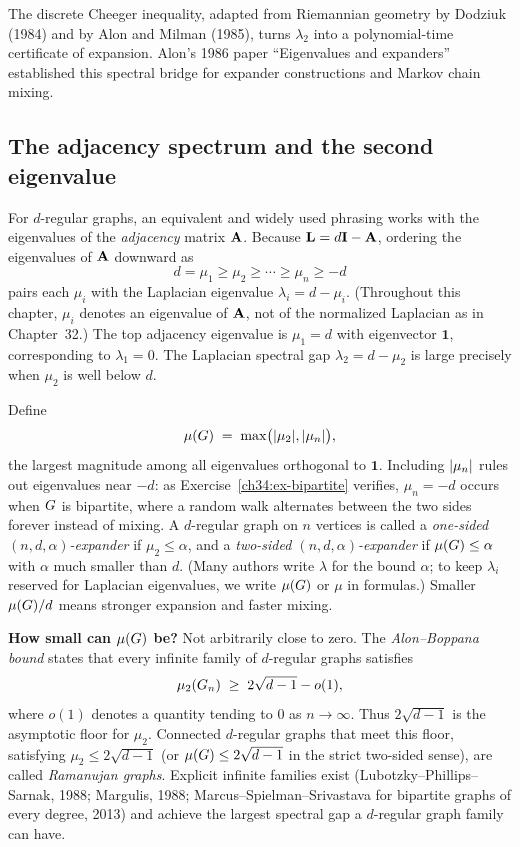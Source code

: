 \begin{marginnotebox}
The discrete Cheeger inequality, adapted from Riemannian geometry by Dodziuk (1984) and by Alon and Milman (1985), turns $\lambda_2$ into a polynomial-time certificate of expansion. Alon's 1986 paper ``Eigenvalues and expanders'' established this spectral bridge for expander constructions and Markov chain mixing.
\end{marginnotebox}

\subsection{The adjacency spectrum and the second eigenvalue}
\label{ch34:adj-spectrum}

For $d$-regular graphs, an equivalent and widely used phrasing works with the eigenvalues of the \emph{adjacency} matrix $\mathbf{A}$. Because $\mathbf{L}=d\mathbf{I}-\mathbf{A}$, ordering the eigenvalues of $\mathbf{A}$ downward as
\[
  d = \mu_1 \ge \mu_2 \ge \cdots \ge \mu_n \ge -d
\]
pairs each $\mu_i$ with the Laplacian eigenvalue $\lambda_i = d - \mu_i$. (Throughout this chapter, $\mu_i$ denotes an eigenvalue of $\mathbf{A}$, not of the normalized Laplacian as in Chapter~32.) The top adjacency eigenvalue is $\mu_1=d$ with eigenvector $\mathbf{1}$, corresponding to $\lambda_1=0$. The Laplacian spectral gap $\lambda_2=d-\mu_2$ is large precisely when $\mu_2$ is well below $d$.

Define
\[
  \mu(G)\;=\;\max\bigl(\lvert\mu_2\rvert,\lvert\mu_n\rvert\bigr),
\]
the largest magnitude among all eigenvalues orthogonal to $\mathbf{1}$. Including $\lvert\mu_n\rvert$ rules out eigenvalues near $-d$: as Exercise~\ref{ch34:ex-bipartite} verifies, $\mu_n=-d$ occurs when $G$ is bipartite, where a random walk alternates between the two sides forever instead of mixing. A $d$-regular graph on $n$ vertices is called a \emph{one-sided $(n,d,\alpha)$-expander} if $\mu_2\le\alpha$, and a \emph{two-sided $(n,d,\alpha)$-expander} if $\mu(G)\le\alpha$ with $\alpha$ much smaller than $d$. (Many authors write $\lambda$ for the bound $\alpha$; to keep $\lambda_i$ reserved for Laplacian eigenvalues, we write $\mu(G)$ or $\mu$ in formulas.) Smaller $\mu(G)/d$ means stronger expansion and faster mixing.

\begin{formalbox}
\textbf{How small can $\mu(G)$ be?} Not arbitrarily close to zero. The \emph{Alon--Boppana bound} states that every infinite family of $d$-regular graphs satisfies
\[
  \mu_2(G_n) \;\ge\; 2\sqrt{d-1} - o(1),
\]
where $o(1)$ denotes a quantity tending to $0$ as $n\to\infty$. Thus $2\sqrt{d-1}$ is the asymptotic floor for $\mu_2$. Connected $d$-regular graphs that meet this floor, satisfying $\mu_2\le 2\sqrt{d-1}$ (or $\mu(G)\le 2\sqrt{d-1}$ in the strict two-sided sense), are called \emph{Ramanujan graphs}. Explicit infinite families exist (Lubotzky--Phillips--Sarnak, 1988; Margulis, 1988; Marcus--Spielman--Srivastava for bipartite graphs of every degree, 2013) and achieve the largest spectral gap a $d$-regular graph family can have.
\end{formalbox}

